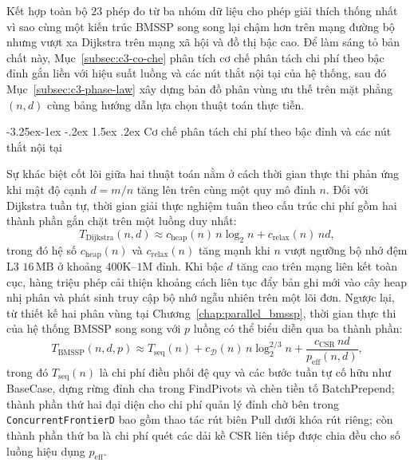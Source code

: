 \documentclass[12pt,a4paper,openany,oneside]{report}
\makeatletter
\theoremstyle{plain}
\renewcommand\subsection{\@startsection{subsection}{2}{\z@}
    {-3.25ex\@plus -1ex \@minus -.2ex}
    {1.5ex \@plus .2ex}
    {\normalfont\normalsize\bfseries}}
\numberwithin{equation}{section}
\def\textsc#1{#1}%
\makeatother
\begin{document}
Kết hợp toàn bộ $23$ phép đo từ ba nhóm dữ liệu cho phép giải thích thống nhất vì sao cùng một kiến trúc BMSSP song song lại chậm hơn trên mạng đường bộ nhưng vượt xa Dijkstra trên mạng xã hội và đồ thị bậc cao. Để làm sáng tỏ bản chất này, Mục~\ref{subsec:c3-co-che} phân tích cơ chế phân tách chi phí theo bậc đỉnh gắn liền với hiệu suất luồng và các nút thắt nội tại của hệ thống, sau đó Mục~\ref{subsec:c3-phase-law} xây dựng bản đồ phân vùng ưu thế trên mặt phẳng $(n, d)$ cùng bảng hướng dẫn lựa chọn thuật toán thực tiễn.

\subsection{Cơ chế phân tách chi phí theo bậc đỉnh và các nút thắt nội tại}\label{subsec:c3-co-che}

Sự khác biệt cốt lõi giữa hai thuật toán nằm ở cách thời gian thực thi phản ứng khi mật độ cạnh $d = m/n$ tăng lên trên cùng một quy mô đỉnh $n$. Đối với Dijkstra tuần tự, thời gian giải thực nghiệm tuân theo cấu trúc chi phí gồm hai thành phần gắn chặt trên một luồng duy nhất:
\begin{equation}
    T_{\mathrm{Dijkstra}}(n, d) \approx c_{\mathrm{heap}}(n)\,n\log_2 n + c_{\mathrm{relax}}(n)\,n d,
    \label{eq:emp-dijkstra}
\end{equation}
trong đó hệ số $c_{\mathrm{heap}}(n)$ và $c_{\mathrm{relax}}(n)$ tăng mạnh khi $n$ vượt ngưỡng bộ nhớ đệm L3 $16\,\mathrm{MB}$ ở khoảng $400\mathrm{K}$--$1\mathrm{M}$ đỉnh. Khi bậc $d$ tăng cao trên mạng liên kết toàn cục, hàng triệu phép cải thiện khoảng cách liên tục đẩy bản ghi mới vào cây heap nhị phân và phát sinh truy cập bộ nhớ ngẫu nhiên trên một lõi đơn. Ngược lại, từ thiết kế hai phân vùng tại Chương~\ref{chap:parallel_bmssp}, thời gian thực thi của hệ thống BMSSP song song với $p$ luồng có thể biểu diễn qua ba thành phần:
\begin{equation}
    T_{\mathrm{BMSSP}}(n, d, p) \approx T_{\mathrm{seq}}(n) + c_{\mathcal{D}}(n)\,n\log_2^{2/3} n + \frac{c_{\mathrm{CSR}}\,n d}{p_{\mathrm{eff}}(n, d)},
    \label{eq:emp-bmssp}
\end{equation}
trong đó $T_{\mathrm{seq}}(n)$ là chi phí điều phối đệ quy và các bước tuần tự cố hữu như \textsc{BaseCase}, dựng rừng đỉnh cha trong \textsc{FindPivots} và chèn tiền tố \textsc{BatchPrepend}; thành phần thứ hai đại diện cho chi phí quản lý đỉnh chờ bên trong \texttt{Concurrent\allowbreak FrontierD} bao gồm thao tác rút biên \textsc{Pull} dưới khóa rút riêng; còn thành phần thứ ba là chi phí quét các dải kề CSR liên tiếp được chia đều cho số luồng hiệu dụng $p_{\mathrm{eff}}$.
\end{document}
